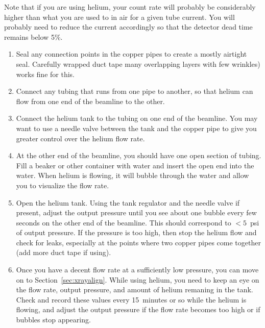 Note that if you are using helium, your count rate will probably be considerably
higher than what you are used to in air for a given tube current. You will
probably need to reduce the current accordingly so that the detector dead time
remains below 5\%.

\begin{enumerate}

\item Seal any connection points in the copper pipes to create a mostly airtight
  seal. Carefully wrapped duct tape many overlapping layers with few wrinkles)
  works fine for this.

\item Connect any tubing that runs from one pipe to another, so that helium can
  flow from one end of the beamline to the other.

\item Connect the helium tank to the tubing on one end of the beamline. You may
  want to use a needle valve between the tank and the copper pipe to give you
  greater control over the helium flow rate.

\item At the other end of the beamline, you should have one open section of
  tubing. Fill a beaker or other container with water and insert the open end
  into the water. When helium is flowing, it will bubble through the water and
  allow you to visualize the flow rate.

\item Open the helium tank. Using the tank regulator and the needle valve if
  present, adjust the output pressure until you see about one bubble every few
  seconds on the other end of the beamline. This should correspond to $<5$~psi
  of output pressure. If the pressure is too high, then stop the helium flow and
  check for leaks, especially at the points where two copper pipes come together
  (add more duct tape if using).

\item Once you have a decent flow rate at a sufficiently low pressure, you can
  move on to Section~\ref{sec:xrayalign}. While using helium, you need to keep
  an eye on the flow rate, output pressure, and amount of helium remaning in the
  tank. Check and record these values every 15~minutes or so while the helium is
  flowing, and adjust the output pressure if the flow rate becomes too high or
  if bubbles stop appearing.

\end{enumerate}

